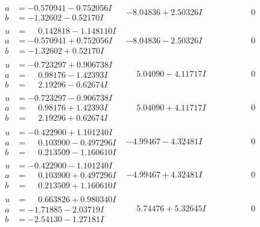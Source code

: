 \documentclass[1p]{elsarticle_modified}
\theoremstyle{definition}
\begin{document}
$$\begin{array}{c|c|c}
\begin{aligned}
a &= -0.570941 - 0.752056 I \\
b &= -1.32602 - 0.52170 I\end{aligned}
 & -8.04836 + 2.50326 I & \phantom{-0.000000 } 0 \\ \hline\begin{aligned}
u &= \phantom{-}0.142818 - 1.148110 I \\
a &= -0.570941 + 0.752056 I \\
b &= -1.32602 + 0.52170 I\end{aligned}
 & -8.04836 - 2.50326 I & \phantom{-0.000000 } 0 \\ \hline\begin{aligned}
u &= -0.723297 + 0.906738 I \\
a &= \phantom{-}0.98176 - 1.42393 I \\
b &= \phantom{-}2.19296 - 0.62674 I\end{aligned}
 & \phantom{-}5.04090 - 4.11717 I & \phantom{-0.000000 } 0 \\ \hline\begin{aligned}
u &= -0.723297 - 0.906738 I \\
a &= \phantom{-}0.98176 + 1.42393 I \\
b &= \phantom{-}2.19296 + 0.62674 I\end{aligned}
 & \phantom{-}5.04090 + 4.11717 I & \phantom{-0.000000 } 0 \\ \hline\begin{aligned}
u &= -0.422900 + 1.101240 I \\
a &= \phantom{-}0.103900 - 0.497296 I \\
b &= \phantom{-}0.213509 - 1.160610 I\end{aligned}
 & -4.99467 - 4.32481 I & \phantom{-0.000000 } 0 \\ \hline\begin{aligned}
u &= -0.422900 - 1.101240 I \\
a &= \phantom{-}0.103900 + 0.497296 I \\
b &= \phantom{-}0.213509 + 1.160610 I\end{aligned}
 & -4.99467 + 4.32481 I & \phantom{-0.000000 } 0 \\ \hline\begin{aligned}
u &= \phantom{-}0.663826 + 0.980340 I \\
a &= -1.71885 - 2.03719 I \\
b &= -2.54130 - 1.27181 I\end{aligned}
 & \phantom{-}5.74476 + 5.32645 I & \phantom{-0.000000 } 0 \\ \hline\begin{aligned}

\end{aligned}
\end{array}$$
\end{document}
